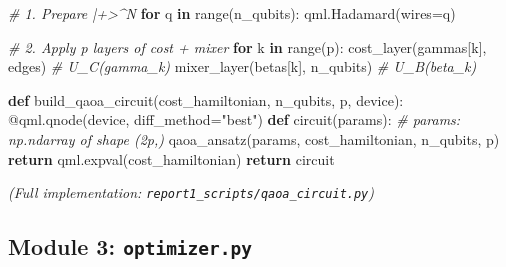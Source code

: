 \documentclass[
  11pt,
]{report}
\newenvironment{Shaded}{}{}
\newcommand{\AttributeTok}[1]{\textcolor[rgb]{0.49,0.56,0.16}{#1}}
\newcommand{\BuiltInTok}[1]{\textcolor[rgb]{0.00,0.50,0.00}{#1}}
\newcommand{\CommentTok}[1]{\textcolor[rgb]{0.38,0.63,0.69}{\textit{#1}}}
\newcommand{\ControlFlowTok}[1]{\textcolor[rgb]{0.00,0.44,0.13}{\textbf{#1}}}
\newcommand{\KeywordTok}[1]{\textcolor[rgb]{0.00,0.44,0.13}{\textbf{#1}}}
\newcommand{\NormalTok}[1]{#1}
\newcommand{\OperatorTok}[1]{\textcolor[rgb]{0.40,0.40,0.40}{#1}}
\newcommand{\StringTok}[1]{\textcolor[rgb]{0.25,0.44,0.63}{#1}}
\begin{document}
\begin{Shaded}
\begin{Highlighting}[]
    \CommentTok{\# 1. Prepare |+\textgreater{}\^{}N}
    \ControlFlowTok{for}\NormalTok{ q }\KeywordTok{in} \BuiltInTok{range}\NormalTok{(n\_qubits):}
\NormalTok{        qml.Hadamard(wires}\OperatorTok{=}\NormalTok{q)}

    \CommentTok{\# 2. Apply p layers of cost + mixer}
    \ControlFlowTok{for}\NormalTok{ k }\KeywordTok{in} \BuiltInTok{range}\NormalTok{(p):}
\NormalTok{        cost\_layer(gammas[k], edges)     }\CommentTok{\# U\_C(gamma\_k)}
\NormalTok{        mixer\_layer(betas[k], n\_qubits)  }\CommentTok{\# U\_B(beta\_k)}


\KeywordTok{def}\NormalTok{ build\_qaoa\_circuit(cost\_hamiltonian, n\_qubits, p, device):}
    \AttributeTok{@qml.qnode}\NormalTok{(device, diff\_method}\OperatorTok{=}\StringTok{"best"}\NormalTok{)}
    \KeywordTok{def}\NormalTok{ circuit(params):}
        \CommentTok{\# params: np.ndarray of shape (2p,)}
\NormalTok{        qaoa\_ansatz(params, cost\_hamiltonian, n\_qubits, p)}
        \ControlFlowTok{return}\NormalTok{ qml.expval(cost\_hamiltonian)}
    \ControlFlowTok{return}\NormalTok{ circuit}
\end{Highlighting}
\end{Shaded}

\emph{(Full implementation: \texttt{report1\_scripts/qaoa\_circuit.py})}

\subsection{\texorpdfstring{Module 3:
\texttt{optimizer.py}}{Module 3: optimizer.py}}\label{module-3-optimizer.py}
\end{document}
